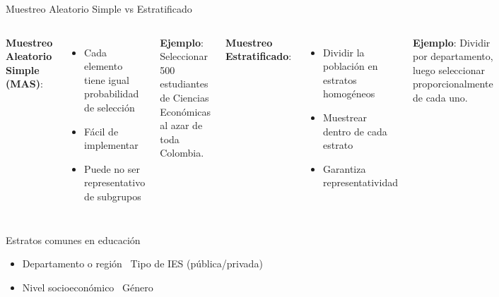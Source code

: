 \documentclass[aspectratio=169, 11pt]{beamer}
\begin{document}
\begin{frame}{Muestreo Aleatorio Simple vs Estratificado}
\begin{columns}[T]
\textbf{Muestreo Aleatorio Simple (MAS)}:
\begin{itemize}
  \item Cada elemento tiene igual probabilidad de selección
  \item Fácil de implementar
  \item Puede no ser representativo de subgrupos
\end{itemize}

\vspace{0.2cm}
\textbf{Ejemplo}: Seleccionar 500 estudiantes de Ciencias Econ\'omicas al azar de toda Colombia.

\textbf{Muestreo Estratificado}:
\begin{itemize}
  \item Dividir la población en \alert{estratos} homogéneos
  \item Muestrear dentro de cada estrato
  \item Garantiza representatividad
\end{itemize}

\vspace{0.2cm}
\textbf{Ejemplo}: Dividir por departamento, luego seleccionar proporcionalmente de cada uno.
\end{columns}

\vspace{0.3cm}
\begin{block}{Estratos comunes en educación}
\begin{itemize}
  \item Departamento o región \quad\quad \textbullet\ Tipo de IES (pública/privada)
  \item Nivel socioeconómico \quad\quad \textbullet\ Género
\end{itemize}
\end{block}
\end{frame}
\end{document}
